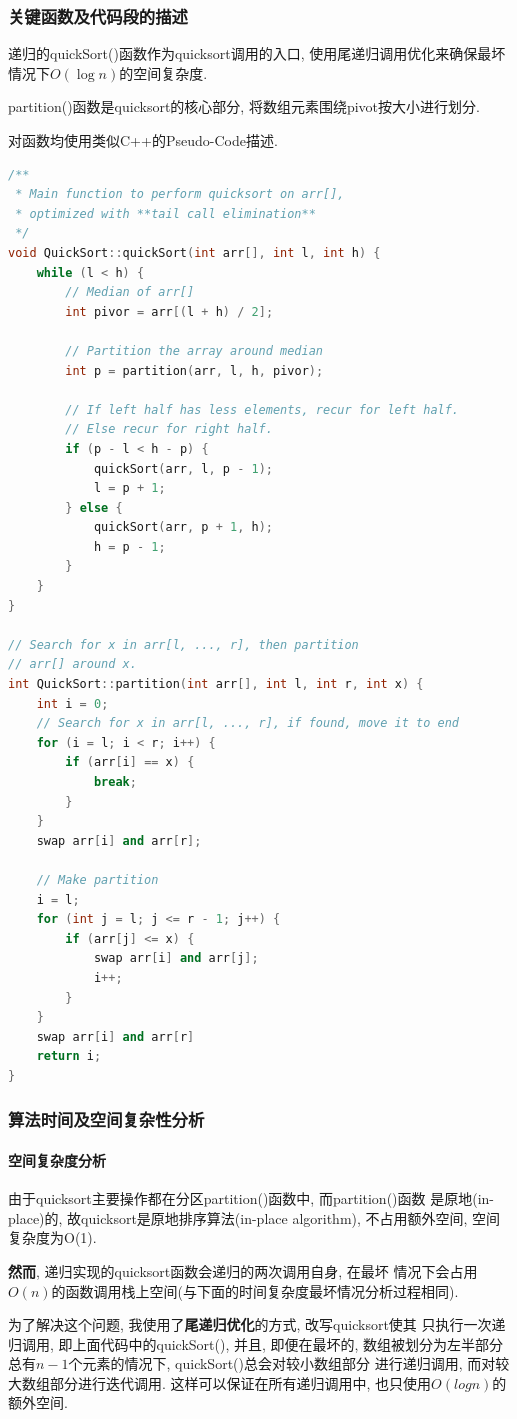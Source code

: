 \subsubsection{关键函数及代码段的描述}
递归的quickSort()函数作为quicksort调用的入口, 使用尾递归调用优化来确保最坏
情况下$O(\log{n})$的空间复杂度.\par
partition()函数是quicksort的核心部分, 将数组元素围绕pivot按大小进行划分.\par
对函数均使用类似C++的Pseudo-Code描述.
\begin{lstlisting}[language=c++]
/**
 * Main function to perform quicksort on arr[],
 * optimized with **tail call elimination**
 */
void QuickSort::quickSort(int arr[], int l, int h) {
    while (l < h) {
        // Median of arr[]
        int pivor = arr[(l + h) / 2];

        // Partition the array around median
        int p = partition(arr, l, h, pivor);

        // If left half has less elements, recur for left half.
        // Else recur for right half.
        if (p - l < h - p) {
            quickSort(arr, l, p - 1);
            l = p + 1;
        } else {
            quickSort(arr, p + 1, h);
            h = p - 1;
        }
    }
}

// Search for x in arr[l, ..., r], then partition
// arr[] around x.
int QuickSort::partition(int arr[], int l, int r, int x) {
    int i = 0;
    // Search for x in arr[l, ..., r], if found, move it to end
    for (i = l; i < r; i++) {
        if (arr[i] == x) {
            break;
        }
    }
    swap arr[i] and arr[r];

    // Make partition
    i = l;
    for (int j = l; j <= r - 1; j++) {
        if (arr[j] <= x) {
            swap arr[i] and arr[j];
            i++;
        }
    }
    swap arr[i] and arr[r]
    return i;
}
\end{lstlisting}

\subsubsection{算法时间及空间复杂性分析}
\paragraph{空间复杂度分析}
\label{par:quicksortSpace}
由于quicksort主要操作都在分区partition()函数中, 而partition()函数
是原地(in-place)的, 故quicksort是原地排序算法(in-place algorithm),
不占用额外空间, 空间复杂度为O(1).\par
\textbf{然而}, 递归实现的quicksort函数会递归的两次调用自身, 在最坏
情况下会占用$O(n)$的函数调用栈上空间(与下面的时间复杂度最坏情况分析过程相同).\par
为了解决这个问题, 我使用了\textbf{尾递归优化}的方式, 改写quicksort使其
只执行一次递归调用, 即上面代码中的quickSort(), 并且, 即便在最坏的,
数组被划分为左半部分总有$n-1$个元素的情况下, quickSort()总会对较小数组部分
进行递归调用, 而对较大数组部分进行迭代调用. 这样可以保证在所有递归调用中,
也只使用$O(log{n})$的额外空间.

